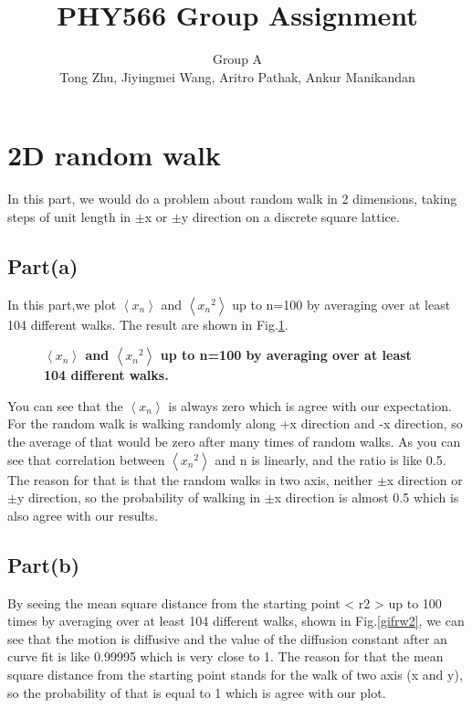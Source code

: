 \documentclass[11pt, oneside]{article}   	%
\title{{\bf PHY566 Group Assignment }}
\author{Group A\\ Tong Zhu, Jiyingmei Wang, Aritro Pathak, Ankur Manikandan}
\begin{document}
\maketitle
\section{2D random walk}
  In this part, we would do a problem about random walk in 2 dimensions, taking steps of unit length in $\pm$x or $\pm$y direction on a discrete square lattice.
\subsection{Part(a)}
  In this part,we plot $\left \langle x_n \right\rangle$ and $\left \langle {x_n}^2 \right\rangle$ up to n=100 by averaging over at least 104 different walks. The result are shown in Fig.\ref{figrw1}.

\begin{figure}[h]
\begin{center}
\caption{{\bf $\left \langle x_n \right\rangle$ and $\left \langle {x_n}^2 \right\rangle$ up to n=100 by averaging over at least 104 different walks. }}
\label{figrw1}
\end{center}
\end{figure}

You can see that the $\left \langle x_n \right\rangle$ is always zero which is agree with our expectation. For the random walk is walking randomly along +x direction and -x direction, so the average of that would be zero after many times of random walks. As you can see that correlation between $\left \langle {x_n}^2 \right\rangle$ and n is linearly, and the ratio is like 0.5. The reason for that is that the random walks in two axis, neither $\pm$x direction or $\pm$y direction, so the probability of walking in $\pm$x direction is almost 0.5 which is also agree with our results.

\subsection{Part(b)}
  By seeing the mean square distance from the starting point < r2 > up to 100 times by averaging over at least 104 different walks, shown in Fig.\ref{gifrw2}, we can see that the motion is diffusive and the value of the diffusion constant after an curve fit is like 0.99995 which is very close to 1. The reason for that the mean square distance from the starting point stands for the walk of two axis (x and y), so the probability of that is equal to 1 which is agree with our plot.
  
\end{document}
